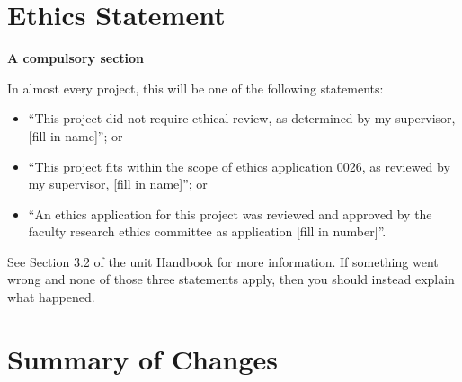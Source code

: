 \documentclass[ oneside,%
                    author={Joshua Felmeden},
                    degree={MEng},
                     title={Semantic Analysis of Financial Headlines Based on Realised Stock Returns},
                  subtitle={}]{dissertation}
\begin{document}


\makedecl





\tableofcontents
\listoffigures
\listoftables




\chapter*{Ethics Statement}

{\bf A compulsory section} 
\vspace{1cm} 

In almost every project, this will be one of the following statements:
    \begin{itemize}
        \item ``This project did not require ethical review, as determined by my supervisor, [fill in name]''; or
        \item ``This project fits within the scope of ethics application 0026, as reviewed by my supervisor, [fill in name]''; or
        \item ``An ethics application for this project was reviewed and approved by the faculty research ethics committee as application [fill in number]''.
    \end{itemize}
    
See Section 3.2 of the unit Handbook for more information. If something went wrong and none of those three statements apply, then you should instead explain what happened.



\chapter*{Summary of Changes}
\end{document}
